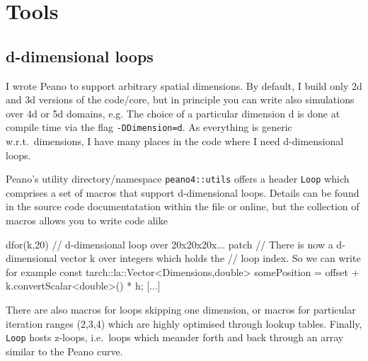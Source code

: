 \chapter{Tools}
\label{section:tools}


\section{d-dimensional loops}

I wrote Peano to support arbitrary spatial dimensions.
By default, I build only 2d and 3d versions of the code/core, but in principle
you can write also simulations over 4d or 5d domains, e.g.
The choice of a particular dimension d is done at compile time via the
flag \texttt{-DDimension=d}.
As everything is generic w.r.t.~dimensions, I have many places in the code where
I need d-dimensional loops.


Peano's utility directory/namespace \texttt{peano4::utils} offers a header
\texttt{Loop} which comprises a set of macros that support d-dimensional loops.
Details can be found in the source code documentatation within the file or
online, but the collection of macros allows you to write code alike

\begin{code}
  dfor(k,20) { // d-dimensional loop over 20x20x20x... patch
    // There is now a d-dimensional vector k over integers which holds the 
    // loop index. So we can write for example
    const tarch::la::Vector<Dimensions,double> somePosition = 
      offset + k.convertScalar<double>() * h;
    [...]
  }
\end{code}

\noindent
There are also macros for loops skipping one dimension, or macros for particular
iteration ranges (2,3,4) which are highly optimised through lookup tables.
Finally, \texttt{Loop} hosts z-loops, i.e.~loops which meander forth and back
through an array similar to the Peano curve.



